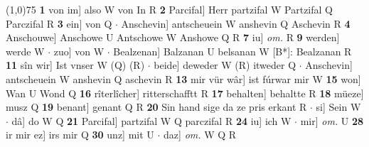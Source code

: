 \documentclass[8pt,a4paper,notitlepage]{article}
\begin{document}
\begin{table}[ht]
\begin{minipage}[t]{0.5\linewidth}
\line(1,0){75} \newline
\textbf{1} von im] also W von In R \textbf{2} Parcifal] Herr partzifal W Partzifal Q Parczifal R \textbf{3} ein] von Q  $\cdot$ Anschevin] antscheuein W anshevin Q Aschevin R \textbf{4} Anschouwe] Anschowe U Antschowe W Anshowe Q R \textbf{7} iu] \textit{om.} R \textbf{9} werden] werde W  $\cdot$ zuo] von W  $\cdot$ Bealzenan] Balzanan U belsanan W [B*]: Bealzanan R \textbf{11} sîn wir] Ist vnser W (Q) (R)  $\cdot$ beide] deweder W (R) itweder Q  $\cdot$ Anschevin] antscheuein W anshevin Q aschevin R \textbf{13} mir vür wâr] ist fúrwar mir W \textbf{15} won] Wan U Wond Q \textbf{16} rîterlîcher] ritterschafftt R \textbf{17} behalten] behaltte R \textbf{18} müeze] musz Q \textbf{19} benant] genant Q R \textbf{20} Sin hand sige da ze pris erkant R  $\cdot$ si] Sein W  $\cdot$ dâ] do W Q \textbf{21} Parcifal] partzifal W Q parczifal R \textbf{24} iu] ich W  $\cdot$ mir] \textit{om.} U \textbf{28} ir mir ez] irs mir Q \textbf{30} unz] mit U  $\cdot$ daz] \textit{om.} W Q R \newline
\end{minipage}
\end{table}
\end{document}
